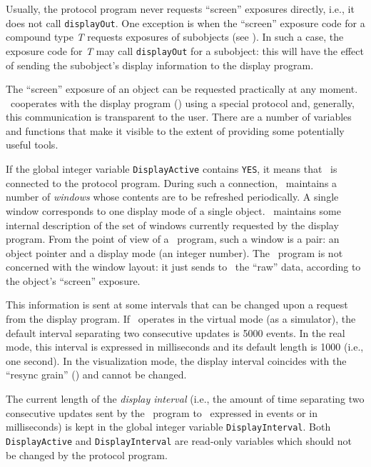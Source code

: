 Usually, the protocol program never requests ``screen'' exposures directly,
i.e., it does not call {\tt displayOut}.
One exception is when the ``screen'' exposure code for a compound type {\em T\/}
requests exposures of subobjects (see ).
In such a case, the exposure code for {\em T\/} may call {\tt displayOut} for
a subobject: this will have the effect of sending
the subobject's display information to the display program.

The ``screen'' exposure of an object can be requested practically
at any moment.
\smurph\ cooperates with the display program (\dsd)
using a special protocol
and, generally, this communication is transparent to the user.
There are a number of variables and functions that make it visible
to the extent of providing some potentially useful tools.

If the global integer variable {\tt DisplayActive} contains {\tt YES},
it means that \dsd\ is connected to the protocol program.
During such a connection, \dsd\ maintains a number
of {\em windows\/} whose contents are to be refreshed periodically.
A single window corresponds to one display mode of a single object.
\smurph\ maintains some internal description of the set of windows
currently requested by the display program.
From the point of view of a \smurph\ program, such a window is a pair:
an object pointer and a display mode (an integer number).
The \smurph\ program is not concerned with the window layout: it just sends to
\dsd\ the ``raw'' data, according to the object's ``screen'' exposure.

This information is sent at some intervals that can be changed upon a
request from the display program.
If \smurph\ operates in the virtual mode (as a simulator), the default
interval separating two consecutive updates is 5000 events.
In the real mode, this interval is expressed in milliseconds and its default
length is 1000 (i.e., one second).
In the visualization mode, the display interval coincides with the
``resync grain'' () and cannot be changed.

The current length of the {\em display interval\/}
(i.e., the amount of time separating
two consecutive updates sent by the \smurph\ program to \dsd\ expressed
in events or in milliseconds)
is kept in the global integer variable {\tt DisplayInterval}.
Both {\tt DisplayActive} and {\tt DisplayInterval} are read-only variables
which should not be changed by the protocol program.


